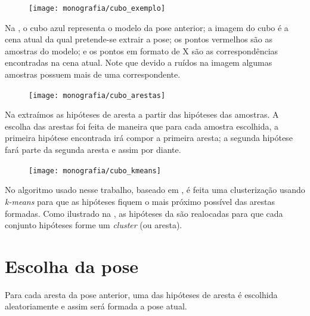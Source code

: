 \begin{figure}[ht!]
\centering
\texttt{[image: monografia/cubo\_exemplo]}
\caption{}
\label{cubo_0}
\end{figure}

Na , o cubo azul representa o modelo da pose anterior; a imagem do cubo é a cena atual da qual pretende-se extrair a pose; os pontos vermelhos são as amostras do modelo; e os pontos em formato de X são as correspondências encontradas na cena atual. Note que devido a ruídos na imagem algumas amostras possuem mais de uma correspondente.

\begin{figure}[ht!]
\centering
\texttt{[image: monografia/cubo\_arestas]}
\caption{}
\label{cubo_arestas}
\end{figure}

Na  extraímos as hipóteses de aresta a partir das hipóteses das amostras. A escolha das arestas foi feita de maneira que para cada amostra escolhida, a primeira hipótese encontrada irá compor a primeira aresta; a segunda hipótese fará parte da segunda aresta e assim por diante.

\begin{figure}[ht!]
\centering
\texttt{[image: monografia/cubo\_kmeans]}
\caption{}
\label{cubo_kmeans}
\end{figure}

No algoritmo usado nesse trabalho, baseado em \cite{celine}, é feita uma clusterização usando \emph{k-means} para que as hipóteses fiquem o mais próximo possível das arestas formadas. Como ilustrado na , as hipóteses da  são realocadas para que cada conjunto hipóteses forme um \emph{cluster} (ou aresta).

\section{Escolha da pose}

Para cada aresta da pose anterior, uma das hipóteses de aresta é escolhida aleatoriamente e assim será formada a pose atual.


